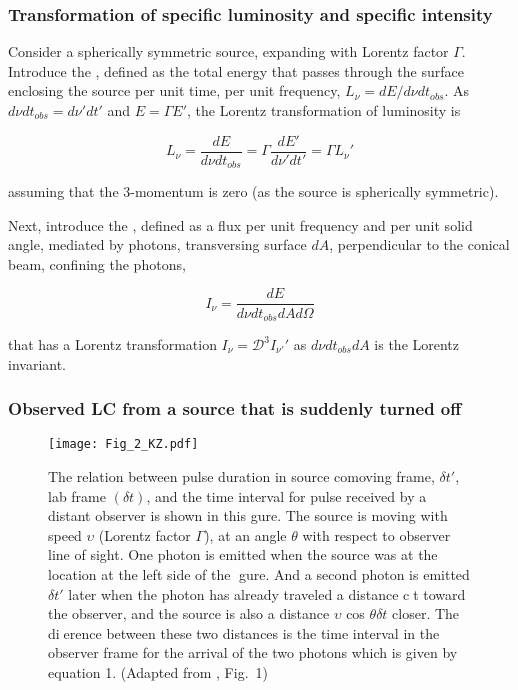 \subsubsection{Transformation of specific luminosity and specific intensity}

Consider a spherically symmetric source, expanding with Lorentz factor $\Gamma$. 
Introduce the , defined as the total energy that passes through the surface enclosing the source per unit time, per unit frequency, $L_{\nu} = dE / d\nu dt_{obs}$. 
As $d\nu dt_{obs} = d\nu' dt'$ and $E=\Gamma E'$, the Lorentz transformation of luminosity is

\begin{equation}
L_{\nu} = \frac{dE}{d\nu dt_{obs}} = \Gamma \frac{dE'}{d\nu' dt'} = \Gamma L_{\nu}'
\end{equation}

assuming that the $3$-momentum is zero (as the source is spherically symmetric).

Next, introduce the , defined as a flux per unit frequency and per unit solid angle, mediated by photons, transversing surface $dA$, perpendicular to the conical beam, confining the photons, 

\begin{equation}
I_{\nu} = \frac{dE}{d\nu dt_{obs} dA d\Omega}
\end{equation}

that has a Lorentz transformation $I_{\nu} = \mathcal{D}^3 I_{\nu'}'$ as $d\nu dt_{obs} dA$ is the Lorentz invariant.


\subsubsection{Observed \ac{LC} from a source that is suddenly turned off}

\begin{figure*}[t]
    \centering 
    \texttt{[image: Fig\_2\_KZ.pdf]}
    \caption{
        The relation between pulse duration in source comoving frame, $\delta t'$, lab frame
        $(\delta t)$, and the time interval for pulse received by a distant observer is shown in this
        gure. The source is moving with speed $\upsilon$ (Lorentz factor $\Gamma$), at an angle $\theta$ with
        respect to observer line of sight. One photon is emitted when the source was at the
        location at the left side of the gure. And a second photon is emitted $\delta t'$ later when
        the photon has already traveled a distance ct toward the observer, and the source
        is also a distance $\upsilon$ cos $\theta\delta t$ closer. The dierence between these two distances is the
        time interval in the observer frame for the arrival of the two photons which is given
        by equation 1.
        (Adapted from \citet{Kumar:2014upa}, Fig.~1)
    }
    \label{fig:aafg:theory:sr2}
\end{figure*}


